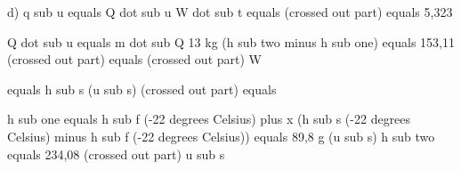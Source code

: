 d) q sub u equals Q dot sub u
W dot sub t
equals (crossed out part) equals 5,323

Q dot sub u equals m dot sub Q 13 kg (h sub two minus h sub one) equals 153,11 (crossed out part) equals (crossed out part) W

equals h sub s (u sub s) (crossed out part) equals

h sub one equals h sub f (-22 degrees Celsius) plus x (h sub s (-22 degrees Celsius) minus h sub f (-22 degrees Celsius))
equals 89,8 g (u sub s)
h sub two equals 234,08 (crossed out part) u sub s